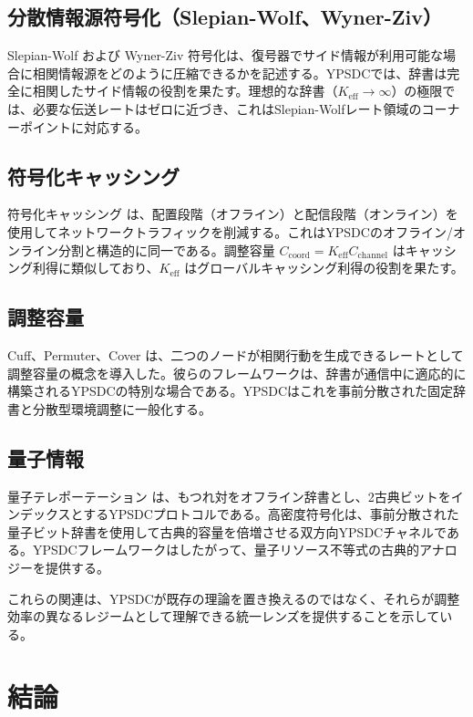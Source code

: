 \documentclass[12pt,a4paper]{article}
\theoremstyle{definition}
\theoremstyle{remark}
\begin{document}
	\subsection*{分散情報源符号化（Slepian-Wolf、Wyner-Ziv）}
	Slepian-Wolf \cite{SlepianWolf1973} および Wyner-Ziv \cite{WynerZiv1976} 符号化は、復号器でサイド情報が利用可能な場合に相関情報源をどのように圧縮できるかを記述する。YPSDCでは、辞書は完全に相関したサイド情報の役割を果たす。理想的な辞書（$K_{\mathrm{eff}} \to \infty$）の極限では、必要な伝送レートはゼロに近づき、これはSlepian-Wolfレート領域のコーナーポイントに対応する。
	
	\subsection*{符号化キャッシング}
	符号化キャッシング \cite{MaddahAli2014} は、配置段階（オフライン）と配信段階（オンライン）を使用してネットワークトラフィックを削減する。これはYPSDCのオフライン/オンライン分割と構造的に同一である。調整容量 $C_{\mathrm{coord}} = K_{\mathrm{eff}} C_{\mathrm{channel}}$ はキャッシング利得に類似しており、$K_{\mathrm{eff}}$ はグローバルキャッシング利得の役割を果たす。
	
	\subsection*{調整容量}
	Cuff、Permuter、Cover \cite{Cuff2013} は、二つのノードが相関行動を生成できるレートとして調整容量の概念を導入した。彼らのフレームワークは、辞書が通信中に適応的に構築されるYPSDCの特別な場合である。YPSDCはこれを事前分散された固定辞書と分散型環境調整に一般化する。
	
	\subsection*{量子情報}
	量子テレポーテーション \cite{Bennett1993} は、もつれ対をオフライン辞書とし、2古典ビットをインデックスとするYPSDCプロトコルである。高密度符号化は、事前分散された量子ビット辞書を使用して古典的容量を倍増させる双方向YPSDCチャネルである。YPSDCフレームワークはしたがって、量子リソース不等式の古典的アナロジーを提供する。
	
	これらの関連は、YPSDCが既存の理論を置き換えるのではなく、それらが調整効率の異なるレジームとして理解できる統一レンズを提供することを示している。
	
	\clearpage
	\section{結論}
	
\end{document}
